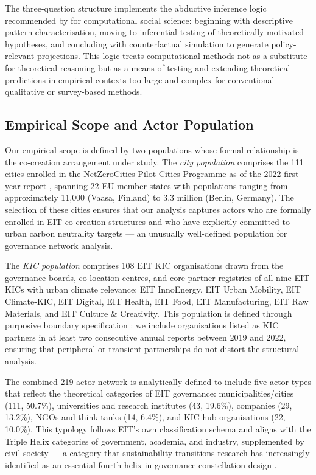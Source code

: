 \documentclass[review,12pt]{elsarticle}
\begin{document}
The three-question structure implements the abductive inference logic recommended by \citet{grimmer2021machine} for computational social science: beginning with descriptive pattern characterisation, moving to inferential testing of theoretically motivated hypotheses, and concluding with counterfactual simulation to generate policy-relevant projections. This logic treats computational methods not as a substitute for theoretical reasoning but as a means of testing and extending theoretical predictions in empirical contexts too large and complex for conventional qualitative or survey-based methods.

\subsection{Empirical Scope and Actor Population}

Our empirical scope is defined by two populations whose formal relationship is the co-creation arrangement under study. The \emph{city population} comprises the 111 cities enrolled in the NetZeroCities Pilot Cities Programme as of the 2022 first-year report \citep{nzc2022pilot}, spanning 22 EU member states with populations ranging from approximately 11{,}000 (Vaasa, Finland) to 3.3 million (Berlin, Germany). The selection of these cities ensures that our analysis captures actors who are formally enrolled in EIT co-creation structures and who have explicitly committed to urban carbon neutrality targets --- an unusually well-defined population for governance network analysis.

The \emph{KIC population} comprises 108 EIT KIC organisations drawn from the governance boards, co-location centres, and core partner registries of all nine EIT KICs with urban climate relevance: EIT InnoEnergy, EIT Urban Mobility, EIT Climate-KIC, EIT Digital, EIT Health, EIT Food, EIT Manufacturing, EIT Raw Materials, and EIT Culture \& Creativity. This population is defined through purposive boundary specification \citep{wasserman1994social}: we include organisations listed as KIC partners in at least two consecutive annual reports between 2019 and 2022, ensuring that peripheral or transient partnerships do not distort the structural analysis.

The combined 219-actor network is analytically defined to include five actor types that reflect the theoretical categories of EIT governance: municipalities/cities (111, 50.7\%), universities and research institutes (43, 19.6\%), companies (29, 13.2\%), NGOs and think-tanks (14, 6.4\%), and KIC hub organisations (22, 10.0\%). This typology follows EIT's own classification schema and aligns with the Triple Helix categories of government, academia, and industry, supplemented by civil society --- a category that sustainability transitions research has increasingly identified as an essential fourth helix in governance constellation design \citep{carayannis2012mode3}.
\end{document}

